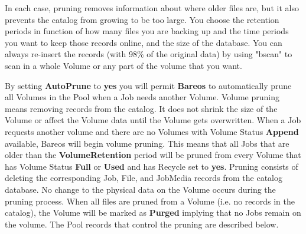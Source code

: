 In each case, pruning removes information about where older files are, but it
also prevents the catalog from growing to be too large. You choose the
retention periods in function of how many files you are backing up and the
time periods you want to keep those records online, and the size of the
database. You can always re-insert the records (with 98\% of the original data)
by using "bscan" to scan in a whole Volume or any part of the volume that
you want.

By setting {\bf AutoPrune} to {\bf yes} you will permit {\bf Bareos} to
automatically prune all Volumes in the Pool when a Job needs another Volume.
Volume pruning means removing records from the catalog. It does not shrink the
size of the Volume or affect the Volume data until the Volume gets
overwritten. When a Job requests another volume and there are no Volumes with
Volume Status {\bf Append} available, Bareos will begin volume pruning. This
means that all Jobs that are older than the {\bf VolumeRetention} period will
be pruned from every Volume that has Volume Status {\bf Full} or {\bf Used}
and has Recycle set to {\bf yes}. Pruning consists of deleting the
corresponding Job, File, and JobMedia records from the catalog database. No
change to the physical data on the Volume occurs during the pruning process.
When all files are pruned from a Volume (i.e. no records in the catalog), the
Volume will be marked as {\bf Purged} implying that no Jobs remain on the
volume. The Pool records that control the pruning are described below.

